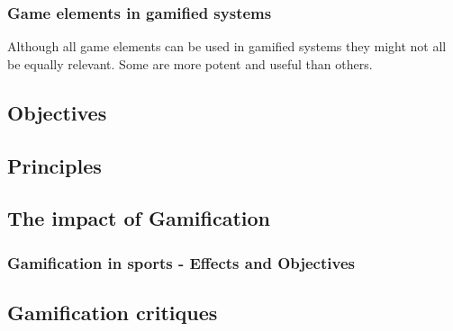 \subsubsection{Game elements in gamified systems}
Although all game elements can be used in gamified systems they might not all be equally relevant. Some are more potent and useful than others.%

\subsection{Objectives}
\subsection{Principles}
\subsection{The impact of Gamification}
\subsubsection{Gamification in sports - Effects and Objectives}
\subsection{Gamification critiques}

